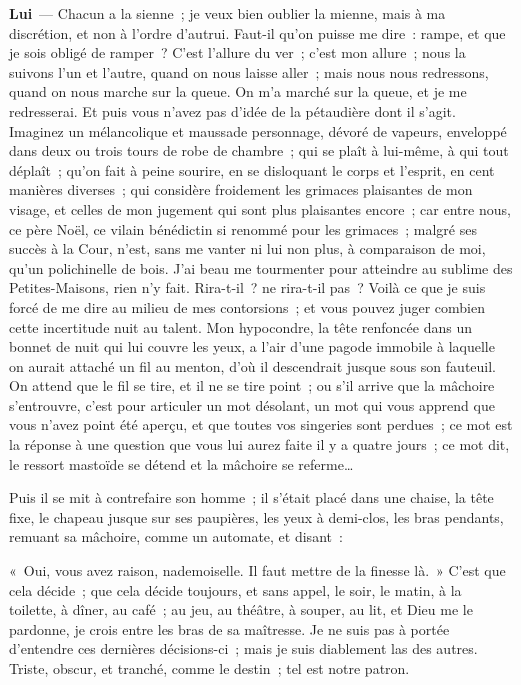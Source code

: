 \documentclass[french,twoside]{book} %
\newcommand{\labelchar}[1]{\textbf{\color{rubric} #1}}
\begin{document}
\labelchar{Lui} — Chacun a la sienne ; je veux bien oublier la mienne, mais à ma discrétion, et non à l’ordre d’autrui. Faut-il qu’on puisse me dire : rampe, et que je sois obligé de ramper ? C’est l’allure du ver ; c’est mon allure ; nous la suivons l’un et l’autre, quand on nous laisse aller ; mais nous nous redressons, quand on nous marche sur la queue. On m’a marché sur la queue, et je me redresserai. Et puis vous n’avez pas d’idée de la pétaudière dont il s’agit. Imaginez un mélancolique et maussade personnage, dévoré de vapeurs, enveloppé dans deux ou trois tours de robe de chambre ; qui se plaît à lui-même, à qui tout déplaît ; qu’on fait à peine sourire, en se disloquant le corps et l’esprit, en cent manières diverses ; qui considère froidement les grimaces plaisantes de mon visage, et celles de mon jugement qui sont plus plaisantes encore ; car entre nous, ce père Noël, ce vilain bénédictin si renommé pour les grimaces ; malgré ses succès à la Cour, n’est, sans me vanter ni lui non plus, à comparaison de moi, qu’un polichinelle de bois. J’ai beau me tourmenter pour atteindre au sublime des Petites-Maisons, rien n’y fait. Rira-t-il ? ne rira-t-il pas ? Voilà ce que je suis forcé de me dire au milieu de mes contorsions ; et vous pouvez juger combien cette incertitude nuit au talent. Mon hypocondre, la tête renfoncée dans un bonnet de nuit qui lui couvre les yeux, a l’air d’une pagode immobile à laquelle on aurait attaché un fil au menton, d’où il descendrait jusque sous son fauteuil. On attend que le fil se tire, et il ne se tire point ; ou s’il arrive que la mâchoire s’entrouvre, c’est pour articuler un mot désolant, un mot qui vous apprend que vous n’avez point été aperçu, et que toutes vos singeries sont perdues ; ce mot est la réponse à une question que vous lui aurez faite il y a quatre jours ; ce mot dit, le ressort mastoïde se détend et la mâchoire se referme…\par
Puis il se mit à contrefaire son homme ; il s’était placé dans une chaise, la tête fixe, le chapeau jusque sur ses paupières, les yeux à demi-clos, les bras pendants, remuant sa mâchoire, comme un automate, et disant :\par
« Oui, vous avez raison, nademoiselle. Il faut mettre de la finesse là. » C’est que cela décide ; que cela décide toujours, et sans appel, le soir, le matin, à la toilette, à dîner, au café ; au jeu, au théâtre, à souper, au lit, et Dieu me le pardonne, je crois entre les bras de sa maîtresse. Je ne suis pas à portée d’entendre ces dernières décisions-ci ; mais je suis diablement las des autres. Triste, obscur, et tranché, comme le destin ; tel est notre patron.\par
\end{document}
